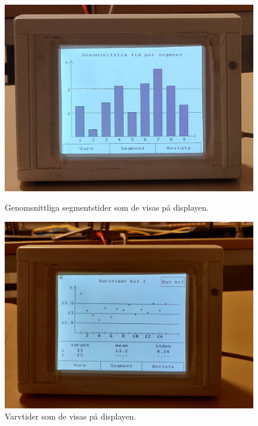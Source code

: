 \begin{figure}
	\centering
	\includegraphics[width=0.75\linewidth] {Figures/genomsnitt_segment}
	\caption{Genomsnittliga segmentstider som de visas på displayen.}
	\label{fig:display-seg}
	
	\vspace*{2\floatsep}%
	
	\centering
	\includegraphics [width=0.75\linewidth] {Figures/varvtider}
	\caption{Varvtider som de visas på displayen.}
	\label{fig:display-lap}
\end{figure}
